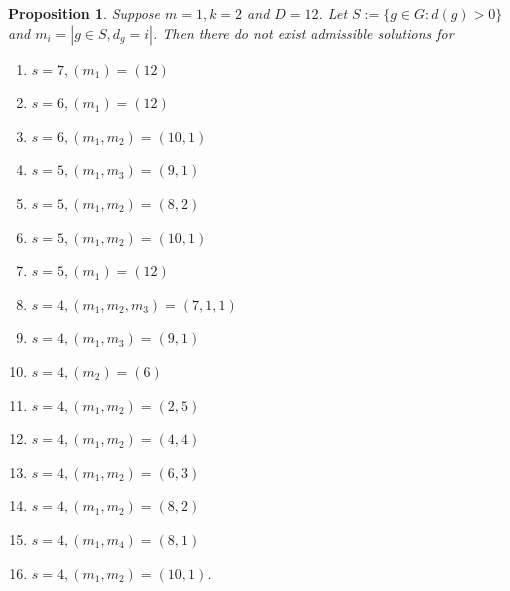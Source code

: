\documentclass[10pt,a4paper]{amsart}
\newtheorem{proposition}{Proposition}
\begin{document}
\begin{proposition}\label{m = 1; k = 2; D = 12 impossibility}
Suppose $m = 1, k = 2$ and $D = 12$. Let $S:=\{g\in G : d(g)>0\}$ and $m_i = | g \in S, d_g = i|$.  Then there do not exist admissible solutions for 
\begin{enumerate}
    \item $s = 7, (m_1) = (12)$
    \item $s = 6, (m_1) = (12)$
    \item $s = 6, (m_1, m_2) = (10,1)$
    \item $s = 5, (m_1,m_3) = (9,1)$
    \item $s = 5, (m_1,m_2) = (8,2)$
    \item $s = 5, (m_1,m_2) = (10,1)$
    \item $s = 5, (m_1) = (12)$
    \item $s = 4, (m_1,m_2,m_3)=(7,1,1)$
    \item $s = 4, (m_1,m_3)=(9,1)$
    \item $s = 4, (m_2)=(6)$
    \item $s = 4, (m_1,m_2)=(2,5)$
    \item $s = 4, (m_1,m_2)=(4,4)$
    \item $s = 4, (m_1,m_2)=(6,3)$
    \item $s = 4, (m_1,m_2)=(8,2)$
    \item $s = 4, (m_1,m_4)=(8,1)$
    \item $s = 4, (m_1,m_2)=(10,1)$.
    
\end{enumerate}
\end{proposition}
\end{document}
